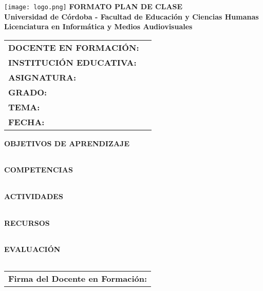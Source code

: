 \documentclass[a4paper,12pt]{article}
\begin{document}
\begin{center}
    \vspace*{1cm}
    \texttt{[image: logo.png]} %
    \vspace{0.5cm}
    \textbf{\Large FORMATO PLAN DE CLASE} \\
    \vspace{0.5cm}
    \textbf{Universidad de Córdoba - Facultad de Educación y Ciencias Humanas} \\
    \textbf{Licenciatura en Informática y Medios Audiovisuales}
\end{center}

\vspace{0.5cm}
\begin{tabularx}{\textwidth}{@{}p{5cm}X@{}}
    \toprule
    \textbf{DOCENTE EN FORMACIÓN:} & \hrulefill \\
    \textbf{INSTITUCIÓN EDUCATIVA:} & \hrulefill \\
    \textbf{ASIGNATURA:} & \hrulefill \\
    \textbf{GRADO:} & \hrulefill \\
    \textbf{TEMA:} & \hrulefill \\
    \textbf{FECHA:} & \hrulefill \\
    \bottomrule
\end{tabularx}

\vspace{0.5cm}
\noindent
\textbf{OBJETIVOS DE APRENDIZAJE}
\begin{tabularx}{\textwidth}{|X|}
    \hline
    \vspace{2cm} \\ \hline
\end{tabularx}

\vspace{0.5cm}
\noindent
\textbf{COMPETENCIAS}
\begin{tabularx}{\textwidth}{|X|}
    \hline
    \vspace{2cm} \\ \hline
\end{tabularx}

\vspace{0.5cm}
\noindent
\textbf{ACTIVIDADES}
\begin{tabularx}{\textwidth}{|X|}
    \hline
    \vspace{2cm} \\ \hline
\end{tabularx}

\vspace{0.5cm}
\noindent
\textbf{RECURSOS}
\begin{tabularx}{\textwidth}{|X|}
    \hline
    \vspace{2cm} \\ \hline
\end{tabularx}

\vspace{0.5cm}
\noindent
\textbf{EVALUACIÓN}
\begin{tabularx}{\textwidth}{|X|}
    \hline
    \vspace{2cm} \\ \hline
\end{tabularx}

\vspace{0.5cm}
\begin{center}
    \begin{tabular}{p{7cm}}
        \hline
        \textbf{Firma del Docente en Formación:} \hrulefill \\
    \end{tabular}
\end{center}
\end{document}
